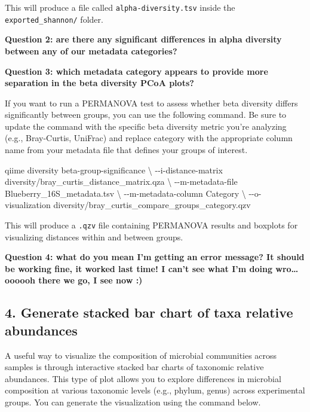 \documentclass[
]{book}
\newenvironment{Shaded}{\begin{snugshade}}{\end{snugshade}}
\newcommand{\AttributeTok}[1]{\textcolor[rgb]{0.13,0.29,0.53}{#1}}
\newcommand{\DataTypeTok}[1]{\textcolor[rgb]{0.13,0.29,0.53}{#1}}
\newcommand{\ExtensionTok}[1]{#1}
\newcommand{\NormalTok}[1]{#1}
\begin{document}
This will produce a file called \texttt{alpha-diversity.tsv} inside the \texttt{exported\_shannon/} folder.

\textbf{Question 2: are there any significant differences in alpha diversity between any of our metadata categories?}

\textbf{Question 3: which metadata category appears to provide more separation in the beta diversity PCoA plots?}

If you want to run a PERMANOVA test to assess whether beta diversity differs significantly between groups, you can use the following command. Be sure to update the command with the specific beta diversity metric you're analyzing (e.g., Bray-Curtis, UniFrac) and replace category with the appropriate column name from your metadata file that defines your groups of interest.

\begin{Shaded}
\begin{Highlighting}[]
\ExtensionTok{qiime}\NormalTok{ diversity beta{-}group{-}significance }\DataTypeTok{\textbackslash{}}
  \AttributeTok{{-}{-}i{-}distance{-}matrix}\NormalTok{ diversity/bray\_curtis\_distance\_matrix.qza }\DataTypeTok{\textbackslash{}}
  \AttributeTok{{-}{-}m{-}metadata{-}file}\NormalTok{ Blueberry\_16S\_metadata.tsv }\DataTypeTok{\textbackslash{}}
  \AttributeTok{{-}{-}m{-}metadata{-}column}\NormalTok{ Category }\DataTypeTok{\textbackslash{}}
  \AttributeTok{{-}{-}o{-}visualization}\NormalTok{ diversity/bray\_curtis\_compare\_groups\_category.qzv}
\end{Highlighting}
\end{Shaded}

This will produce a \texttt{.qzv} file containing PERMANOVA results and boxplots for visualizing distances within and between groups.

\textbf{Question 4: what do you mean I'm getting an error message? It should be working fine, it worked last time! I can't see what I'm doing wro\ldots{} oooooh there we go, I see now :)}

\subsection{4. Generate stacked bar chart of taxa relative abundances}\label{stacked-bar-chart}

A useful way to visualize the composition of microbial communities across samples is through interactive stacked bar charts of taxonomic relative abundances. This type of plot allows you to explore differences in microbial composition at various taxonomic levels (e.g., phylum, genus) across experimental groups. You can generate the visualization using the command below.
\end{document}
